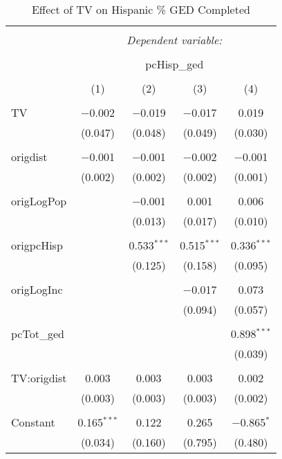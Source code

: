 
\begin{table}[!htbp] \centering 
  \caption{Effect of TV on Hispanic \% GED Completed} 
  \label{} 
\begin{tabular}{@{\extracolsep{5pt}}lcccc} 
\\[-1.8ex]\hline 
\hline \\[-1.8ex] 
 & \multicolumn{4}{c}{\textit{Dependent variable:}} \\ 
\cline{2-5} 
\\[-1.8ex] & \multicolumn{4}{c}{pcHisp\_ged} \\ 
\\[-1.8ex] & (1) & (2) & (3) & (4)\\ 
\hline \\[-1.8ex] 
 TV & $-$0.002 & $-$0.019 & $-$0.017 & 0.019 \\ 
  & (0.047) & (0.048) & (0.049) & (0.030) \\ 
  & & & & \\ 
 origdist & $-$0.001 & $-$0.001 & $-$0.002 & $-$0.001 \\ 
  & (0.002) & (0.002) & (0.002) & (0.001) \\ 
  & & & & \\ 
 origLogPop &  & $-$0.001 & 0.001 & 0.006 \\ 
  &  & (0.013) & (0.017) & (0.010) \\ 
  & & & & \\ 
 origpcHisp &  & 0.533$^{***}$ & 0.515$^{***}$ & 0.336$^{***}$ \\ 
  &  & (0.125) & (0.158) & (0.095) \\ 
  & & & & \\ 
 origLogInc &  &  & $-$0.017 & 0.073 \\ 
  &  &  & (0.094) & (0.057) \\ 
  & & & & \\ 
 pcTot\_ged &  &  &  & 0.898$^{***}$ \\ 
  &  &  &  & (0.039) \\ 
  & & & & \\ 
 TV:origdist & 0.003 & 0.003 & 0.003 & 0.002 \\ 
  & (0.003) & (0.003) & (0.003) & (0.002) \\ 
  & & & & \\ 
 Constant & 0.165$^{***}$ & 0.122 & 0.265 & $-$0.865$^{*}$ \\ 
  & (0.034) & (0.160) & (0.795) & (0.480) \\ 

\end{tabular}
\end{table}
